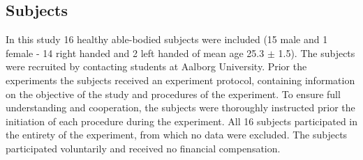 \subsection{Subjects}
In this study 16 healthy able-bodied subjects were included (15 male and 1 female - 14 right handed and 2 left handed of mean age 25.3 $\pm$ 1.5). The subjects were recruited by contacting students at Aalborg University. Prior the experiments the subjects received an experiment protocol, containing information on the objective of the study and procedures of the experiment. To ensure full understanding and cooperation, the subjects were thoroughly instructed prior the initiation of each procedure during the experiment. All 16 subjects participated in the entirety of the experiment, from which no data were excluded. The subjects participated voluntarily and received no financial compensation.